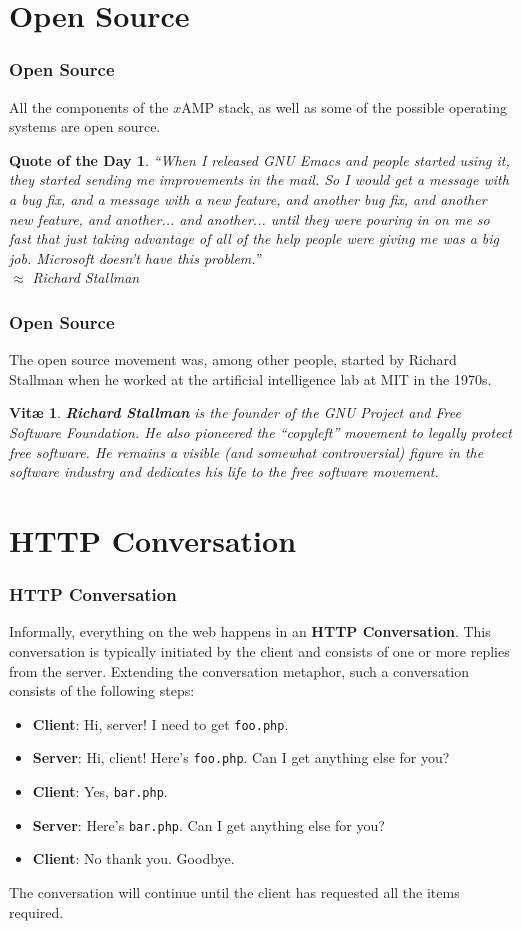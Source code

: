 \documentclass[aspectratio=169]{beamer}
\newtheorem{vita}{Vit\ae}
\newtheorem{qotd}{Quote of the Day}
\begin{document}
\section{Open Source}
\begin{frame}
\frametitle{Open Source}
All the components of the $x$AMP stack, as well as some of the possible operating systems are open source.
\pause
\begin{qotd}
``When I released GNU Emacs and people started using it, they started sending me improvements in the mail. So I would get a message with a bug fix, and a message with a new feature, and another bug fix, and another new feature, and another... and another... until they were pouring in on me so fast that just taking advantage of all of the help people were giving me was a big job. Microsoft doesn't have this problem.''\\
$\approx$ Richard Stallman
\end{qotd}
\end{frame}

\begin{frame}
\frametitle{Open Source}
The open source movement was, among other people, started by Richard Stallman when he worked at the artificial intelligence lab at MIT in the 1970s.
\pause
\begin{vita}
\textbf{Richard Stallman} is the founder of the GNU Project and Free Software Foundation. He also pioneered the ``copyleft'' movement to legally protect free software. He remains a visible (and somewhat controversial) figure in the software industry and dedicates his life to the free software movement.
\end{vita}
\end{frame}

\section{HTTP Conversation}
\begin{frame}
\label{slide:conversation}
\frametitle{HTTP Conversation}
Informally, everything on the web happens in an \textbf{HTTP Conversation}. This conversation is typically initiated by the client and consists of one or more replies from the server. Extending the conversation metaphor, such a conversation consists of the following steps:
\begin{itemize}
	\item \textbf{Client}: Hi, server! I need to get \texttt{foo.php}.
	\item \textbf{Server}: Hi, client! Here's \texttt{foo.php}. Can I get anything else for you?
	\item \textbf{Client}: Yes, \texttt{bar.php}.
	\item \textbf{Server}: Here's \texttt{bar.php}. Can I get anything else for you?
	\item \textbf{Client}: No thank you. Goodbye.
\end{itemize}
The conversation will continue until the client has requested all the items required.
\end{frame}
\end{document}
